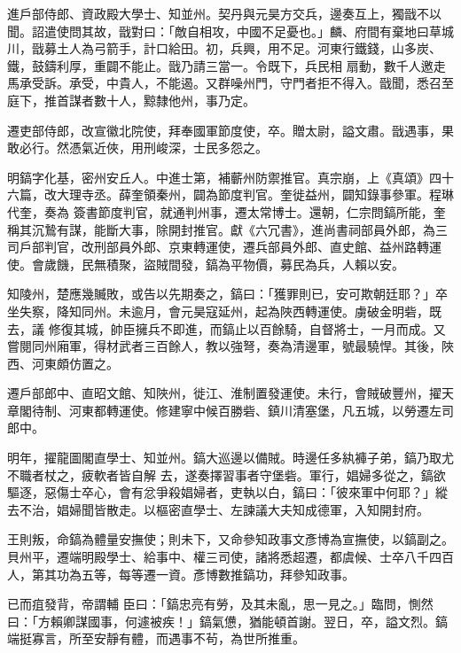 \begin{pinyinscope}
 進戶部侍郎、資政殿大學士、知並州。契丹與元昊方交兵，邊奏互上，獨戩不以聞。詔遣使問其故，戩對曰：「敵自相攻，中國不足憂也。」麟、府間有棄地曰草城川，戩募土人為弓箭手，計口給田。初，兵興，用不足。河東行鐵錢，山多炭、鐵，鼓鑄利厚，重闢不能止。戩乃請三當一。令既下，兵民相
 扇動，數千人邀走馬承受訴。承受，中貴人，不能遏。又群噪州門，守門者拒不得入。戩聞，悉召至庭下，推首謀者數十人，黥隸他州，事乃定。



 遷吏部侍郎，改宣徽北院使，拜奉國軍節度使，卒。贈太尉，謚文肅。戩遇事，果敢必行。然憑氣近俠，用刑峻深，士民多怨之。



 明鎬字化基，密州安丘人。中進士第，補蘄州防禦推官。真宗崩，上《真頌》四十六篇，改大理寺丞。薛奎領秦州，闢為節度判官。奎徙益州，闢知錄事參軍。程琳代奎，奏為
 簽書節度判官，就通判州事，遷太常博士。還朝，仁宗問鎬所能，奎稱其沉鷙有謀，能斷大事，除開封推官。獻《六冗書》，進尚書祠部員外郎，為三司戶部判官，改刑部員外郎、京東轉運使，遷兵部員外郎、直史館、益州路轉運使。會歲饑，民無積聚，盜賊間發，鎬為平物價，募民為兵，人賴以安。



 知陵州，楚應幾贓敗，或告以先期奏之，鎬曰：「獲罪則已，安可欺朝廷耶？」卒坐失察，降知同州。未逾月，會元昊寇延州，起為陜西轉運使。虜破金明砦，既去，議
 修復其城，帥臣擁兵不即進，而鎬止以百餘騎，自督將士，一月而成。又嘗閱同州廂軍，得材武者三百餘人，教以強弩，奏為清邊軍，號最驍悍。其後，陜西、河東頗仿置之。



 遷戶部郎中、直昭文館、知陜州，徙江、淮制置發運使。未行，會賊破豐州，擢天章閣待制、河東都轉運使。修建寧中候百勝砦、鎮川清塞堡，凡五城，以勞遷左司郎中。



 明年，擢龍圖閣直學士、知並州。鎬大巡邊以備賊。時邊任多紈褲子弟，鎬乃取尤不職者杖之，疲軟者皆自解
 去，遂奏擇習事者守堡砦。軍行，娼婦多從之，鎬欲驅逐，惡傷士卒心，會有忿爭殺娼婦者，吏執以白，鎬曰：「彼來軍中何耶？」縱去不治，娼婦聞皆散走。以樞密直學士、左諫議大夫知成德軍，入知開封府。



 王則叛，命鎬為體量安撫使；則未下，又命參知政事文彥博為宣撫使，以鎬副之。貝州平，遷端明殿學士、給事中、權三司使，諸將悉超遷，都虞候、士卒八千四百人，第其功為五等，每等遷一資。彥博數推鎬功，拜參知政事。



 已而疽發背，帝謂輔
 臣曰：「鎬忠亮有勞，及其未亂，思一見之。」臨問，惻然曰：「方賴卿謀國事，何遽被疾！」鎬氣憊，猶能頓首謝。翌日，卒，謚文烈。鎬端挺寡言，所至安靜有體，而遇事不茍，為世所推重。




\end{pinyinscope}
